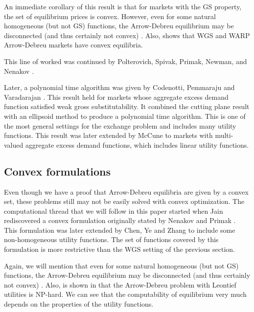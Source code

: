 \documentclass[12pt]{article}
\begin{document}
An immediate corollary of this result is that for markets with the GS property,
the set of equilibrium prices is convex.
However, even for some natural homogeneous (but not GS) functions,
the Arrow-Debreu equilibrium may be disconnected
(and thus certainly not convex) \cite{gjerstad1996multiple}.
Also, \cite[p.~608]{mas1995microeconomic} shows that WGS and WARP Arrow-Debreu
markets have convex equilibria.

This line of worked was continued by Polterovich, Spivak, Primak, Newman,
and Nenakov \cite{nenakov1983algorithm,newman1992complexity,primak1984algorithm,primak1993converging}.

Later, a polynomial time algorithm was given by Codenotti, Pemmaraju and
Varadarajan \cite{codenotti2005polynomial}.
This result held for markets whose aggregate excess demand function satisfied
weak gross substitutability.
It combined the cutting plane result with an ellipsoid method to produce a
polynomial time algorithm.
This is one of the most general settings for the exchange problem and includes
many utility functions. This result was later extended by McCune
\cite{mccune2007extending} to markets with multi-valued aggregate excess
demand functions, which includes linear utility functions.

\subsection{Convex formulations}
Even though we have a proof that Arrow-Debreu equilibria are given by a
convex set, these problems still may not be easily solved with convex
optimization.
The computational thread that we will follow in this paper started when
Jain \cite{jain2007polynomial} rediscovered a convex formulation originally
stated by Nenakov and Primak \cite{nenakov1983algorithm}.
This formulation was later extended by Chen, Ye and
Zhang \cite{chen2007note,chen2010equilibrium} to include some non-homogeneous
utility functions.
The set of functions covered by this formulation is more restrictive than the
WGS setting of the previous section.

Again, we will mention that even for some natural homogeneous (but not GS)
functions, the Arrow-Debreu equilibrium may be disconnected
(and thus certainly not convex) \cite{gjerstad1996multiple}.
Also, is shown in \cite{codenotti2006leontief} that the Arrow-Debreu
problem with Leontief utilities is NP-hard.
We can see that the computability of equilibrium very much depends on the
properties of the utility functions.
\end{document}

